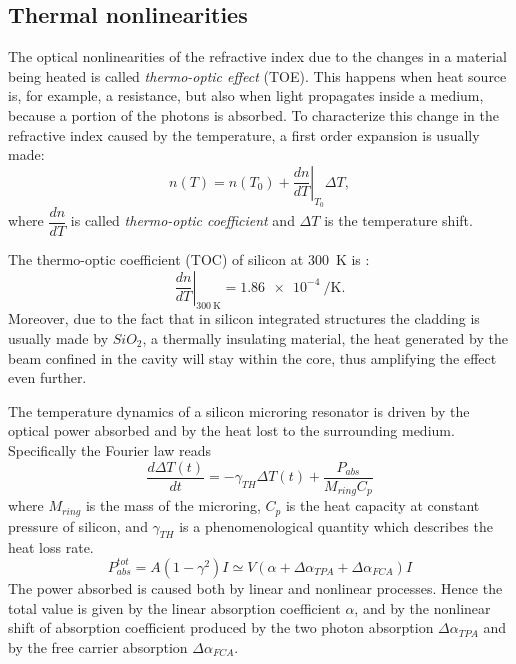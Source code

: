 \subsection{Thermal nonlinearities}
\label{ssec:Thermal_nonlinearities}
The optical nonlinearities of the refractive index due to the changes in a material being heated is called \textit{thermo-optic effect} (TOE).
This happens when heat source is, for example, a resistance, but also when light propagates inside a medium, because a portion of the photons is absorbed.
To characterize this change in the refractive index caused by the temperature, a first order expansion is usually made:
\begin{equation}
	n\left(T\right) = n\left(T_0\right) + \left.\dfrac{dn}{dT}\right|_{T_0} \Delta T,
	\label{eq:TOC}
\end{equation}
where $\dfrac{dn}{dT}$ is called \textit{thermo-optic coefficient} and $\Delta T$ is the temperature shift.

The thermo-optic coefficient (TOC) of silicon at \SI{300}{\K} is \cite{??} :
\begin{equation}
	\left.\dfrac{dn}{dT}\right|_{\SI{300}{\K}} = \SI{1.86e-4}{\per\K}.
	\label{eq:Si_TOC}
\end{equation}
Moreover, due to the fact that in silicon integrated structures the cladding is usually made by $SiO_2$, a thermally insulating material, the heat generated by the beam confined in the cavity will stay within the core, thus amplifying the effect even further.

The temperature dynamics of a silicon microring resonator is driven by the optical power absorbed and by the heat lost to the surrounding medium.
Specifically the Fourier law reads
\begin{equation}
	\dfrac{d\Delta T(t)}{dt} = -\gamma_{TH} \Delta T(t) + \dfrac{P_{abs}}{M_{ring}C_p}
\end{equation}
where $M_{ring}$ is the mass of the microring, $C_p$ is the heat capacity at constant pressure of silicon, and $\gamma_{TH}$ is a phenomenological quantity which describes the heat loss rate.
\begin{equation}
P_{abs}^{tot} = A \left(1-\gamma^2\right) I
	\simeq V\left(\alpha + \Delta\alpha_{TPA} + \Delta\alpha_{FCA} \right) I
\end{equation}
The power absorbed is caused both by linear and nonlinear processes.
Hence the total value is given by the linear absorption coefficient $\alpha$, and by the nonlinear shift of absorption coefficient produced by the two photon absorption $\Delta\alpha_{TPA}$ and by the free carrier absorption $\Delta\alpha_{FCA}$.

